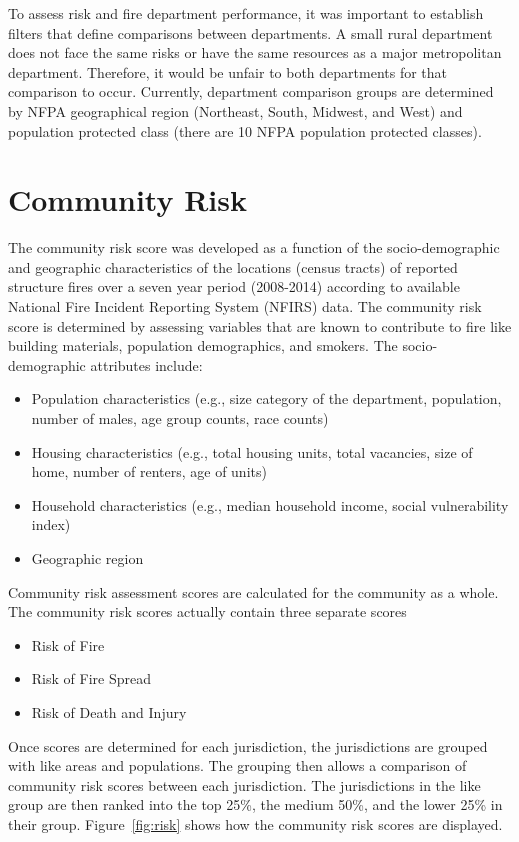 \documentclass[12pt,oneside]{book}
\begin{document}
To assess risk and fire department performance, it was important to establish filters that define comparisons between departments. A small rural department does not face the same risks or have the same resources as a major metropolitan department. Therefore, it would be unfair to both departments for that comparison to occur. Currently, department comparison groups are determined by NFPA geographical region (Northeast, South, Midwest, and West) and population protected class (there are 10 NFPA population protected classes).

\section{Community Risk}

The community risk score was developed as a function of the socio-demographic and geographic characteristics of the locations (census tracts) of reported structure fires over a seven year period (2008-2014) according to available National Fire Incident Reporting System (NFIRS) data. The community risk score is determined by assessing variables that are known to contribute to fire like building materials, population demographics, and smokers. The socio-demographic attributes include:

\begin{itemize}
\item Population characteristics (e.g., size category of the department, population, number of males, age group counts, race counts)
\item Housing characteristics (e.g., total housing units, total vacancies, size of home, number of renters, age of units)
\item Household characteristics (e.g., median household income, social vulnerability index)
\item Geographic region
\end{itemize}

Community risk assessment scores are calculated for the community as a whole. The community risk scores actually contain three separate scores 

\begin{itemize}
\item Risk of Fire
\item Risk of Fire Spread
\item Risk of Death and Injury
\end{itemize}

Once scores are determined for each jurisdiction, the jurisdictions are grouped with like areas and populations.  The grouping then allows a comparison of community risk scores between each jurisdiction.  The jurisdictions in the like group are then ranked into the top 25\%, the medium 50\%, and the lower 25\% in their group. Figure~\ref{fig:risk} shows how the community risk scores are displayed.
\end{document}
